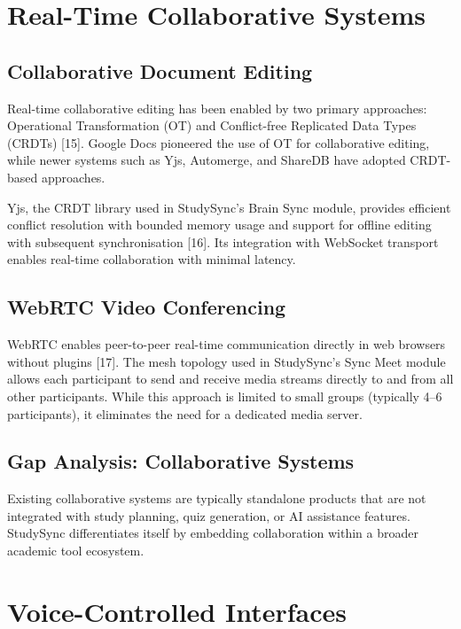 \documentclass[12pt,a4paper]{report}
\begin{document}
\section{Real-Time Collaborative Systems}

\subsection{Collaborative Document Editing}

Real-time collaborative editing has been enabled by two primary approaches: Operational Transformation (OT) and Conflict-free Replicated Data Types (CRDTs) [15]. Google Docs pioneered the use of OT for collaborative editing, while newer systems such as Yjs, Automerge, and ShareDB have adopted CRDT-based approaches.

Yjs, the CRDT library used in StudySync's Brain Sync module, provides efficient conflict resolution with bounded memory usage and support for offline editing with subsequent synchronisation [16]. Its integration with WebSocket transport enables real-time collaboration with minimal latency.

\subsection{WebRTC Video Conferencing}

WebRTC enables peer-to-peer real-time communication directly in web browsers without plugins [17]. The mesh topology used in StudySync's Sync Meet module allows each participant to send and receive media streams directly to and from all other participants. While this approach is limited to small groups (typically 4--6 participants), it eliminates the need for a dedicated media server.

\subsection{Gap Analysis: Collaborative Systems}

Existing collaborative systems are typically standalone products that are not integrated with study planning, quiz generation, or AI assistance features. StudySync differentiates itself by embedding collaboration within a broader academic tool ecosystem.

\section{Voice-Controlled Interfaces}
\end{document}
